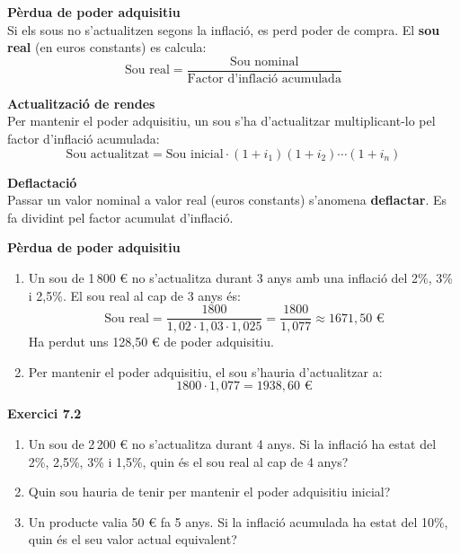 \documentclass[12pt]{article}
\begin{document}
\begin{concept}
\textbf{Pèrdua de poder adquisitiu}\\
Si els sous no s'actualitzen segons la inflació, es perd poder de compra. El \textbf{sou real} (en euros constants) es calcula:
\[
\text{Sou real} = \dfrac{\text{Sou nominal}}{\text{Factor d'inflació acumulada}}
\]

\textbf{Actualització de rendes}\\
Per mantenir el poder adquisitiu, un sou s'ha d'actualitzar multiplicant-lo pel factor d'inflació acumulada:
\[
\text{Sou actualitzat} = \text{Sou inicial} \cdot (1+i_1)(1+i_2)\cdots(1+i_n)
\]

\textbf{Deflactació}\\
Passar un valor nominal a valor real (euros constants) s'anomena \textbf{deflactar}. Es fa dividint pel factor acumulat d'inflació.
\end{concept}

\begin{exemple}
\textbf{Pèrdua de poder adquisitiu}
\begin{enumerate}[label=\alph*)]
    \item Un sou de 1\,800 € no s'actualitza durant 3 anys amb una inflació del 2\%, 3\% i 2{,}5\%. El sou real al cap de 3 anys és:
    \[
    \text{Sou real} = \dfrac{1800}{1{,}02 \cdot 1{,}03 \cdot 1{,}025} = \dfrac{1800}{1{,}077} \approx 1671{,}50 \text{ €}
    \]
    Ha perdut uns 128{,}50 € de poder adquisitiu.
    \item Per mantenir el poder adquisitiu, el sou s'hauria d'actualitzar a:
    \[
    1800 \cdot 1{,}077 = 1938{,}60 \text{ €}
    \]
\end{enumerate}
\end{exemple}

\begin{exercici}
\textbf{Exercici 7.2}\\
\begin{enumerate}[label=\alph*)]
    \item Un sou de 2\,200 € no s'actualitza durant 4 anys. Si la inflació ha estat del 2\%, 2{,}5\%, 3\% i 1{,}5\%, quin és el sou real al cap de 4 anys?
    \item Quin sou hauria de tenir per mantenir el poder adquisitiu inicial?
    \item Un producte valia 50 € fa 5 anys. Si la inflació acumulada ha estat del 10\%, quin és el seu valor actual equivalent?
\end{enumerate}
\end{exercici}
\end{document}
